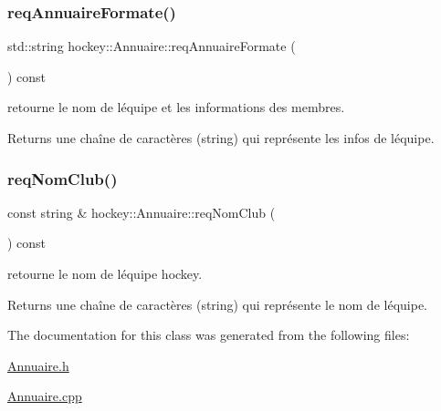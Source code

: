 \subsubsection{\texorpdfstring{req\+Annuaire\+Formate()}{reqAnnuaireFormate()}}
{\footnotesize\ttfamily std\+::string hockey\+::\+Annuaire\+::req\+Annuaire\+Formate (\begin{DoxyParamCaption}{ }\end{DoxyParamCaption}) const}



retourne le nom de l\textquotesingle{}équipe et les informations des membres. 

\begin{DoxyReturn}{Returns}
une chaîne de caractères (string) qui représente les infos de l\textquotesingle{}équipe. 
\end{DoxyReturn}
\mbox{\label{classhockey_1_1Annuaire_a72d2cf91ab310b2f36011ba4639bdcf3}} 
\subsubsection{\texorpdfstring{req\+Nom\+Club()}{reqNomClub()}}
{\footnotesize\ttfamily const string \& hockey\+::\+Annuaire\+::req\+Nom\+Club (\begin{DoxyParamCaption}{ }\end{DoxyParamCaption}) const}



retourne le nom de l\textquotesingle{}équipe hockey. 

\begin{DoxyReturn}{Returns}
une chaîne de caractères (string) qui représente le nom de l\textquotesingle{}équipe. 
\end{DoxyReturn}


The documentation for this class was generated from the following files\+:\begin{DoxyCompactItemize}
\item 
\hyperlink{Annuaire_8h}{Annuaire.\+h}\item 
\hyperlink{Annuaire_8cpp}{Annuaire.\+cpp}\end{DoxyCompactItemize}
